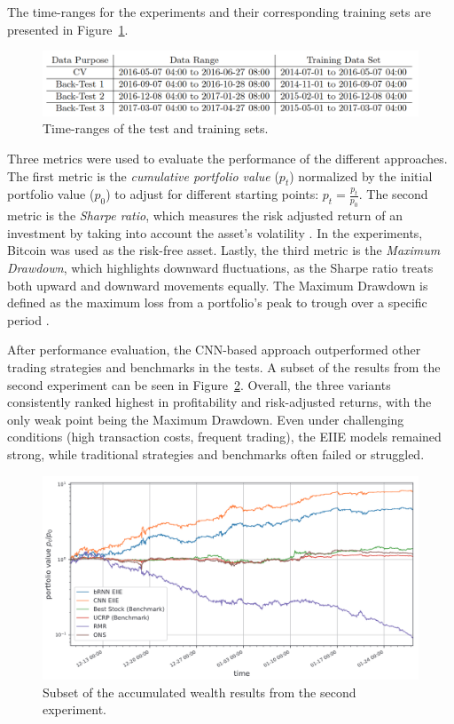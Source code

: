 \documentclass[a4paper,oneside,onecolumn,12pt]{book}
\begin{document}
	The time-ranges for the experiments and their corresponding training sets are presented in Figure~\ref{fig:article_tests}.
	\begin{figure}[H]
	\begin{center}
		\includegraphics[width=\linewidth]{kep/article_test_ranges.png}
		\caption{Time-ranges of the test and training sets.}
		\label{fig:article_tests}
	\end{center}
	\end{figure}
	Three metrics were used to evaluate the performance of the different approaches. The first metric is the \textit{cumulative portfolio value} ($p_t$) normalized by the initial portfolio value ($p_0$) to adjust for different starting points: $p_t = \frac{p_t}{p_0}$. The second metric is the \textit{Sharpe ratio}, which measures the risk adjusted return of an investment by taking into account the asset's volatility \cite{SRDFE}. In the experiments, Bitcoin was used as the risk-free asset. Lastly, the third metric is the \textit{Maximum Drawdown}, which highlights downward fluctuations, as the Sharpe ratio treats both upward and downward movements equally. The Maximum Drawdown is defined as the maximum loss from a portfolio's peak to trough over a specific period \cite{MDDDWFC}.

	After performance evaluation, the CNN-based approach outperformed other trading strategies and benchmarks in the tests. A subset of the results from the second experiment can be seen in Figure~\ref{fig:eiie_results}. Overall, the three variants consistently ranked highest in profitability and risk-adjusted returns, with the only weak point being the Maximum Drawdown. Even under challenging conditions (high transaction costs, frequent trading), the EIIE models remained strong, while traditional strategies and benchmarks often failed or struggled. 
	\begin{figure}[H]
	\begin{center}
		\includegraphics[width=15cm]{kep/article_eiie_result.png}
		\caption{Subset of the accumulated wealth results from the second experiment.}
		\label{fig:eiie_results}
	\end{center}
	\end{figure}
\end{document}
